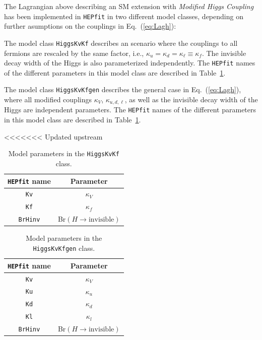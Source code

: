 \documentclass[preprint,3p,12pt]{elsarticle}
\newcommand{\HEPfit}{\texttt{HEPfit}\xspace}
\begin{document}
The Lagrangian above describing an SM extension with {\it Modified Higgs Coupling} has been implemented in {\tt HEPfit} in two different model classes, depending on further asumptions on the couplings in Eq.~(\ref{eq:Lagh}):
%
\begin{itemize}
{\item The model class {\tt HiggsKvKf} describes an scenario where the couplings to all fermions are rescaled by the same factor, i.e., $\kappa_u=\kappa_d=\kappa_\ell \equiv \kappa_f$. The invisible decay width of the Higgs is also parameterized independently. The {\tt HEPfit} names of the different parameters in this model class are described in Table~\ref{tab:HiggsKvKfpars}.}
%
{\item The model class {\tt HiggsKvKfgen} describes the general case in Eq.~(\ref{eq:Lagh}), where all modified couplings $\kappa_V$, $\kappa_{u, d, \ell}$, as well as the invisible decay width of the Higgs are independent parameters. The {\tt HEPfit} names of the different parameters in this model class are described in Table~\ref{tab:HiggsKvKfpars}.
}
%
\end{itemize}
%
<<<<<<< Updated upstream
\begin{table}[tb]
 \centering
 \caption{Model parameters in the {\tt HiggsKvKf} class. }\vspace{0.2cm}
  \begin{tabular}{| c c | }
\hline
%
\textbf{\HEPfit name}&
\textbf{Parameter}\\
%
\hline
 {\tt Kv}&
$\kappa_V$\\
%
 {\tt Kf}&
$\kappa_f$\\
%
 {\tt BrHinv}&
Br$(H\to \mathrm{invisible})$\\
\hline
  \end{tabular}
 \label{tab:HiggsKvKfpars}
\end{table} 

 \begin{table}[tb]
 \centering
 \caption{Model parameters in the {\tt HiggsKvKfgen} class.}\vspace{0.2cm}
  \begin{tabular}{| c c | }
\hline
%
\textbf{\HEPfit name}&
\textbf{Parameter}\\
%
\hline
 {\tt Kv}&
$\kappa_V$\\
%
 {\tt Ku}&
$\kappa_u$\\
%
 {\tt Kd}&
$\kappa_d$\\
%
 {\tt Kl}&
$\kappa_l$\\
%
 {\tt BrHinv}&
Br$(H\to \mathrm{invisible})$\\
\hline
  \end{tabular}
 \label{tab:HiggsKvKfgenpars}
\end{table} 
\end{document}
